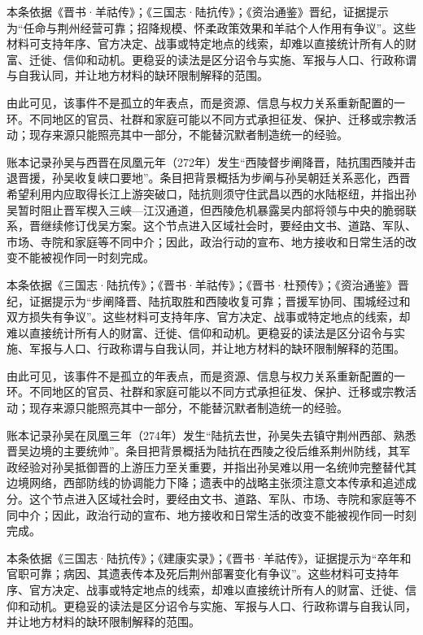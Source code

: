 本条依据《晋书·羊祜传》；《三国志·陆抗传》；《资治通鉴》晋纪，证据提示为“任命与荆州经营可靠；招降规模、怀柔政策效果和羊祜个人作用有争议”。这些材料可支持年序、官方决定、战事或特定地点的线索，却难以直接统计所有人的财富、迁徙、信仰和动机。更稳妥的读法是区分诏令与实施、军报与人口、行政称谓与自我认同，并让地方材料的缺环限制解释的范围。

由此可见，该事件不是孤立的年表点，而是资源、信息与权力关系重新配置的一环。不同地区的官员、社群和家庭可能以不同方式承担征发、保护、迁移或宗教活动；现存来源只能照亮其中一部分，不能替沉默者制造统一的经验。

账本记录孙吴与西晋在凤凰元年（272年）发生“西陵督步阐降晋，陆抗围西陵并击退晋援，孙吴收复峡口要地”。条目把背景概括为步阐与孙吴朝廷关系恶化，西晋希望利用内应取得长江上游突破口，陆抗则须守住武昌以西的水陆枢纽，并指出孙吴暂时阻止晋军楔入三峡—江汉通道，但西陵危机暴露吴内部将领与中央的脆弱联系，晋继续修订伐吴方案。这个节点进入区域社会时，要经由文书、道路、军队、市场、寺院和家庭等不同中介；因此，政治行动的宣布、地方接收和日常生活的改变不能被视作同一时刻完成。

本条依据《三国志·陆抗传》；《晋书·羊祜传》；《晋书·杜预传》；《资治通鉴》晋纪，证据提示为“步阐降晋、陆抗取胜和西陵收复可靠；晋援军协同、围城经过和双方损失有争议”。这些材料可支持年序、官方决定、战事或特定地点的线索，却难以直接统计所有人的财富、迁徙、信仰和动机。更稳妥的读法是区分诏令与实施、军报与人口、行政称谓与自我认同，并让地方材料的缺环限制解释的范围。

由此可见，该事件不是孤立的年表点，而是资源、信息与权力关系重新配置的一环。不同地区的官员、社群和家庭可能以不同方式承担征发、保护、迁移或宗教活动；现存来源只能照亮其中一部分，不能替沉默者制造统一的经验。

账本记录孙吴在凤凰三年（274年）发生“陆抗去世，孙吴失去镇守荆州西部、熟悉晋吴边境的主要统帅”。条目把背景概括为陆抗在西陵之役后维系荆州防线，其军政经验对孙吴抵御晋的上游压力至关重要，并指出孙吴难以用一名统帅完整替代其边境网络，西部防线的协调能力下降；遗表中的战略主张须注意文本传承和追述成分。这个节点进入区域社会时，要经由文书、道路、军队、市场、寺院和家庭等不同中介；因此，政治行动的宣布、地方接收和日常生活的改变不能被视作同一时刻完成。

本条依据《三国志·陆抗传》；《建康实录》；《晋书·羊祜传》，证据提示为“卒年和官职可靠；病因、其遗表传本及死后荆州部署变化有争议”。这些材料可支持年序、官方决定、战事或特定地点的线索，却难以直接统计所有人的财富、迁徙、信仰和动机。更稳妥的读法是区分诏令与实施、军报与人口、行政称谓与自我认同，并让地方材料的缺环限制解释的范围。

